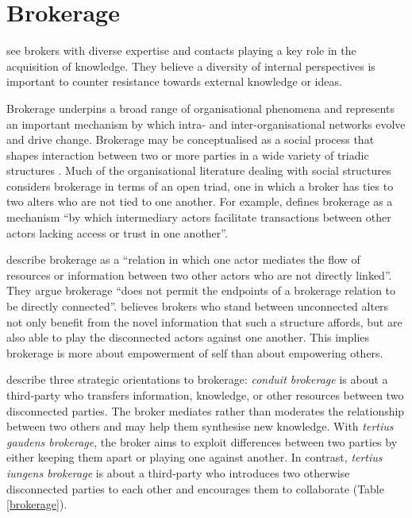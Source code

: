 \section{Brokerage}

\citet{cohen1990absorptive} see brokers with diverse expertise and contacts playing a key role in the acquisition of knowledge. They believe a diversity of internal perspectives is important to counter resistance towards external knowledge or ideas. \medskip

Brokerage underpins a broad range of organisational phenomena and represents an important mechanism by which intra- and inter-organisational networks evolve and drive change. Brokerage may be conceptualised as a social process that shapes interaction between two or more parties in a wide variety of triadic structures \citep{obstfeld2002knowledge}. Much of the organisational literature dealing with social structures considers brokerage in terms of an open triad, one in which a broker has ties to two alters who are not tied to one another. For example, \citet{marsden1982brokerage} defines brokerage as a mechanism \enquote{by which intermediary actors facilitate transactions between other actors lacking access or trust in one another}.

\citet{fernandez1994dilemma} describe brokerage as a \enquote{relation in which one actor mediates the flow of resources or information between two other actors who are not directly linked}. They argue brokerage \enquote{does not permit the endpoints of a brokerage relation to be directly connected}. \citet{burt1992structural} believes brokers who stand between unconnected alters not only benefit from the novel information that such a structure affords, but are also able to play the disconnected actors against one another. This implies brokerage is more about empowerment of self than about empowering others. \medskip

\citet{obstfeld2014brokerage} describe three strategic orientations to brokerage: \emph{conduit brokerage} is about a third-party who transfers information, knowledge, or other resources between two disconnected parties. The broker mediates rather than moderates the relationship between two others and may help them synthesise new knowledge. With \emph{tertius gaudens brokerage}, the broker aims to exploit differences between two parties by either keeping them apart or playing one against another. In contrast, \emph{tertius iungens brokerage} is about a third-party who introduces two otherwise disconnected parties to each other and encourages them to collaborate (Table \ref{brokerage}). \medskip 

